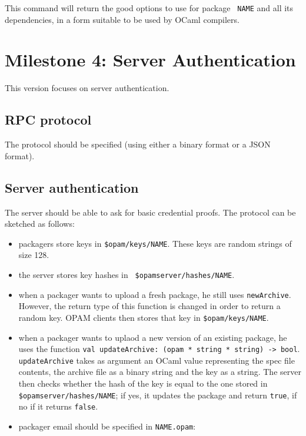 \documentclass[a4paper,11pt]{article}
\begin{document}
This command will return the good options to use for package {\tt
  NAME} and all its dependencies, in a form suitable to be used by
OCaml compilers.

\section{Milestone 4: Server Authentication}

This version focuses on server authentication.

\subsection{RPC protocol}

The protocol should be specified (using either a binary format or a
JSON format).

\subsection{Server authentication}

The server should be able to ask for basic credential proofs. The
protocol can be sketched as follows:

\begin{itemize}

\item packagers store keys in {\tt \$opam/keys/NAME}. These keys are
  random strings of size 128.

\item the server stores key hashes in {\tt
  \$opamserver/hashes/NAME}.

\item when a packager wants to upload a fresh package, he still uses
  {\tt newArchive}. However, the return type of this function is
  changed in order to return a random key. OPAM clients then stores
  that key in {\tt \$opam/keys/NAME}.

\item when a packager wants to uplaod a new version of an existing
  package, he uses the function {\tt val updateArchive: (opam * string
    * string) -> bool}. {\tt updateArchive} takes as argument an OCaml
  value representing the spec file contents, the archive file as a
  binary string and the key as a string. The server then checks
  whether the hash of the key is equal to the one stored in {\tt
    \$opamserver/hashes/NAME}; if yes, it updates the
  package and return {\tt true}, if no if it returns {\tt false}.

\item packager email should be specified in {\tt NAME.opam}:

\end{itemize}
\end{document}
